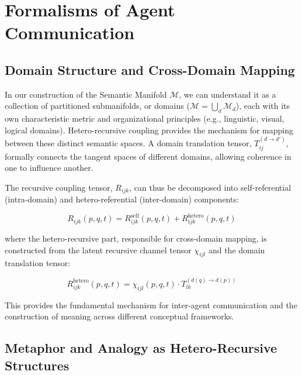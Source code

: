 \chapter{Formalisms of Agent Communication}
\label{14:formalisms_of_agent_communication}


\section{Domain Structure and Cross-Domain Mapping}
\label{14.1:domain_structure_and_cross_domain_mapping}

In our construction of the Semantic Manifold \(\mathcal{M}\), we can understand it as a collection of partitioned submanifolds, or domains (\(\mathcal{M} = \bigcup_d \mathcal{M}_d\)), each with its own characteristic metric and organizational principles (e.g., linguistic, visual, logical domains). Hetero-recursive coupling provides the mechanism for mapping between these distinct semantic spaces. A domain translation tensor, \(T_{ij}^{(d \to d')}\), formally connects the tangent spaces of different domains, allowing coherence in one to influence another.

The recursive coupling tensor, \(R_{ijk}\), can thus be decomposed into self-referential (intra-domain) and hetero-referential (inter-domain) components:

\begin{equation}
R_{ijk}(p, q, t) = R_{ijk}^{\text{self}}(p, q, t) + R_{ijk}^{\text{hetero}}(p, q, t)
\end{equation}

where the hetero-recursive part, responsible for cross-domain mapping, is constructed from the latent recursive channel tensor \(\chi_{ijl}\) and the domain translation tensor:

\begin{equation}
R_{ijk}^{\text{hetero}}(p, q, t) = \chi_{ijl}(p, q, t) \cdot T_{lk}^{(d(q) \to d(p))}
\end{equation}

This provides the fundamental mechanism for inter-agent communication and the construction of meaning across different conceptual frameworks.


\section{Metaphor and Analogy as Hetero-Recursive Structures}
\label{14.2:metaphor_and_analogy_as_hetero_recursive_structures}

